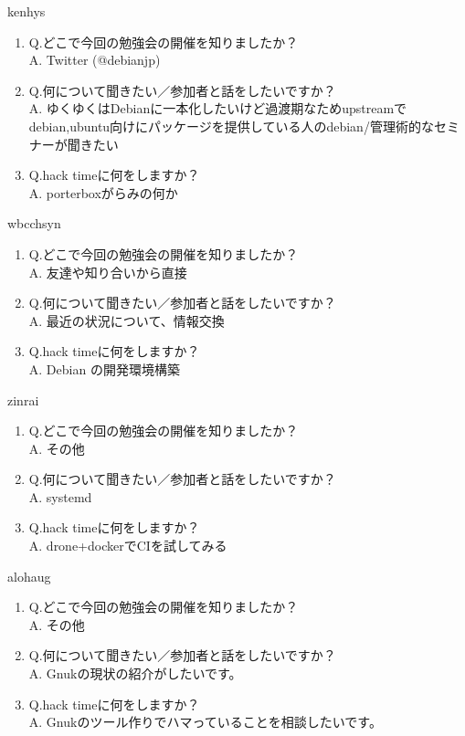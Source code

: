\begin{prework}{ kenhys }
  \begin{enumerate}
  \item Q.どこで今回の勉強会の開催を知りましたか？\\
    A. Twitter (@debianjp)
  \item Q.何について聞きたい／参加者と話をしたいですか？\\
    A. ゆくゆくはDebianに一本化したいけど過渡期なためupstreamでdebian,ubuntu向けにパッケージを提供している人のdebian/管理術的なセミナーが聞きたい
  \item Q.hack timeに何をしますか？\\
    A. porterboxがらみの何か
  \end{enumerate}
\end{prework}

\begin{prework}{ wbcchsyn }
  \begin{enumerate}
  \item Q.どこで今回の勉強会の開催を知りましたか？\\
    A. 友達や知り合いから直接
  \item Q.何について聞きたい／参加者と話をしたいですか？\\
    A. 最近の状況について、情報交換
  \item Q.hack timeに何をしますか？\\
    A. Debian の開発環境構築
  \end{enumerate}
\end{prework}

\begin{prework}{ zinrai }
  \begin{enumerate}
  \item Q.どこで今回の勉強会の開催を知りましたか？\\
    A. その他
  \item Q.何について聞きたい／参加者と話をしたいですか？\\
    A. systemd
  \item Q.hack timeに何をしますか？\\
    A. drone+dockerでCIを試してみる
  \end{enumerate}
\end{prework}

\begin{prework}{ alohaug }
  \begin{enumerate}
  \item Q.どこで今回の勉強会の開催を知りましたか？\\
    A. その他
  \item Q.何について聞きたい／参加者と話をしたいですか？\\
    A. Gnukの現状の紹介がしたいです。
  \item Q.hack timeに何をしますか？\\
    A. Gnukのツール作りでハマっていることを相談したいです。
  \end{enumerate}
\end{prework}

